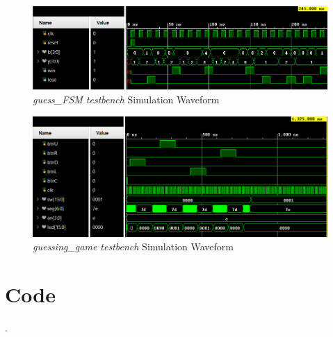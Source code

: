 \documentclass[11pt]{article}
\begin{document}
\begin{figure}[ht]\centering
	\includegraphics[width=1.1\textwidth]{gsfmtest}
	\caption{\textit{guess\_FSM testbench} Simulation Waveform}
	\label{fig:sim_with_table}
\end{figure}

\begin{figure}[ht]\centering
	\includegraphics[width=1.1\textwidth]{gguesstest}
	\caption{\textit{guessing\_game testbench} Simulation Waveform}
	\label{fig:sim_with_table}
\end{figure}

\clearpage

\section*{Code}
.
\end{document}
